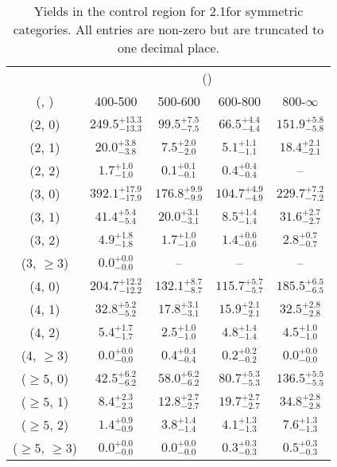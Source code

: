 \begin{table}[h!]
\tiny
\centering
\caption{Yields in the \gj control region for 2.1\ifb for symmetric categories. All entries are non-zero but are truncated to one decimal place.\label{tab:yieldssep_gj_ewk_sym}}
\begin{tabular}
{ccccc}
	\hline\hline
	& \multicolumn{4}{c}{\scalht (\gev)} \\ 
	 (\njet,  \nb) & 400-500 & 500-600 & 600-800 & 800-$\infty$ \\ [0.8ex] 
\hline
	(2, 0) & $249.5^{+ 13.3 }_{- 13.3 }$ & $99.5^{+ 7.5 }_{- 7.5 }$ & $66.5^{+ 4.4 }_{- 4.4 }$ & $151.9^{+ 5.8 }_{- 5.8 }$ \\[0.5ex] 
	(2, 1) & $20.0^{+ 3.8 }_{- 3.8 }$ & $7.5^{+ 2.0 }_{- 2.0 }$ & $5.1^{+ 1.1 }_{- 1.1 }$ & $18.4^{+ 2.1 }_{- 2.1 }$ \\[0.5ex] 
	(2, 2) & $1.7^{+ 1.0 }_{- 1.0 }$ & $0.1^{+ 0.1 }_{- 0.1 }$ & $0.4^{+ 0.4 }_{- 0.4 }$ & -- \\[0.5ex] 
	(3, 0) & $392.1^{+ 17.9 }_{- 17.9 }$ & $176.8^{+ 9.9 }_{- 9.9 }$ & $104.7^{+ 4.9 }_{- 4.9 }$ & $229.7^{+ 7.2 }_{- 7.2 }$ \\[0.5ex] 
	(3, 1) & $41.4^{+ 5.4 }_{- 5.4 }$ & $20.0^{+ 3.1 }_{- 3.1 }$ & $8.5^{+ 1.4 }_{- 1.4 }$ & $31.6^{+ 2.7 }_{- 2.7 }$ \\[0.5ex] 
	(3, 2) & $4.9^{+ 1.8 }_{- 1.8 }$ & $1.7^{+ 1.0 }_{- 1.0 }$ & $1.4^{+ 0.6 }_{- 0.6 }$ & $2.8^{+ 0.7 }_{- 0.7 }$ \\[0.5ex] 
	(3, $\ge3$) & $0.0^{+ 0.0 }_{- 0.0 }$ & -- & -- & -- \\[0.5ex] 
	(4, 0) & $204.7^{+ 12.2 }_{- 12.2 }$ & $132.1^{+ 8.7 }_{- 8.7 }$ & $115.7^{+ 5.7 }_{- 5.7 }$ & $185.5^{+ 6.5 }_{- 6.5 }$ \\[0.5ex] 
	(4, 1) & $32.8^{+ 5.2 }_{- 5.2 }$ & $17.8^{+ 3.1 }_{- 3.1 }$ & $15.9^{+ 2.1 }_{- 2.1 }$ & $32.5^{+ 2.8 }_{- 2.8 }$ \\[0.5ex] 
	(4, 2) & $5.4^{+ 1.7 }_{- 1.7 }$ & $2.5^{+ 1.0 }_{- 1.0 }$ & $4.8^{+ 1.4 }_{- 1.4 }$ & $4.5^{+ 1.0 }_{- 1.0 }$ \\[0.5ex] 
	(4, $\ge3$) & $0.0^{+ 0.0 }_{- 0.0 }$ & $0.4^{+ 0.4 }_{- 0.4 }$ & $0.2^{+ 0.2 }_{- 0.2 }$ & $0.0^{+ 0.0 }_{- 0.0 }$ \\[0.5ex] 
	($\ge5$, 0) & $42.5^{+ 6.2 }_{- 6.2 }$ & $58.0^{+ 6.2 }_{- 6.2 }$ & $80.7^{+ 5.3 }_{- 5.3 }$ & $136.5^{+ 5.5 }_{- 5.5 }$ \\[0.5ex] 
	($\ge5$, 1) & $8.4^{+ 2.3 }_{- 2.3 }$ & $12.8^{+ 2.7 }_{- 2.7 }$ & $19.7^{+ 2.7 }_{- 2.7 }$ & $34.8^{+ 2.8 }_{- 2.8 }$ \\[0.5ex] 
	($\ge5$, 2) & $1.4^{+ 0.9 }_{- 0.9 }$ & $3.8^{+ 1.4 }_{- 1.4 }$ & $4.1^{+ 1.3 }_{- 1.3 }$ & $7.6^{+ 1.3 }_{- 1.3 }$ \\[0.5ex] 
	($\ge5$, $\ge3$) & $0.0^{+ 0.0 }_{- 0.0 }$ & $0.0^{+ 0.0 }_{- 0.0 }$ & $0.3^{+ 0.3 }_{- 0.3 }$ & $0.5^{+ 0.3 }_{- 0.3 }$ \\[0.5ex] 
	\hline
	\hline
\end{tabular}
\end{table}
